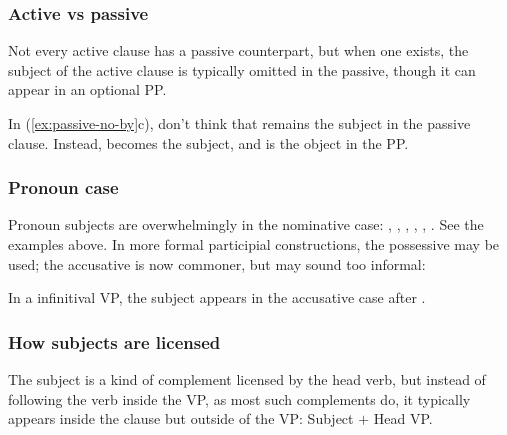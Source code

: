 \subsubsection*{Active vs passive}
Not every active clause has a passive counterpart, but when one exists, the subject of the active clause is typically omitted in the passive, though it can appear in an optional  PP. 

\ea\label{ex:passive-no-by}
    \z
\z
In (\ref{ex:passive-no-by}c), don't think that  remains the subject in the passive clause. Instead,  becomes the subject, and  is the object in the  PP.

\subsubsection*{Pronoun case}
Pronoun subjects are overwhelmingly in the nominative case: , , , , , . See the examples above. In more formal participial constructions, the possessive may be used; the accusative is now commoner, but may sound too informal:  

\ea
    \z
\z
In a  infinitival VP, the subject appears in the accusative case after .    

\subsubsection*{How subjects are licensed}
The subject is a kind of complement licensed by the head verb, but instead of following the verb inside the VP, as most such complements do, it typically appears inside the clause but outside of the VP: Subject $+$ Head VP.


